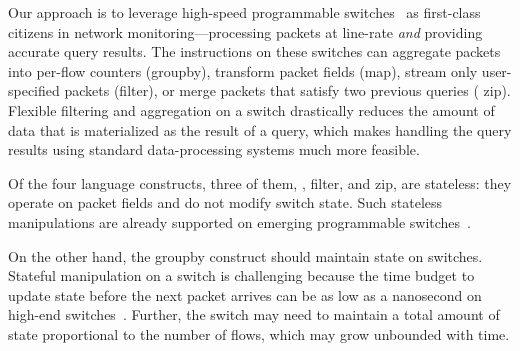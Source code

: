 Our approach is to leverage high-speed programmable switches~\cite{rmt, xpliant,
  tofino, flexpipe} as first-class citizens in network monitoring---processing
packets at line-rate {\em and} providing accurate query results.
The instructions on these switches can aggregate packets into per-flow counters
({\ct groupby}), transform packet fields ({\ct map}), stream only user-specified
packets ({\ct filter}), or merge packets that satisfy two previous queries ({\ct
  zip}). Flexible filtering and aggregation on a switch drastically reduces the
amount of data that is materialized as the result of a query, which makes
handling the query results using standard data-processing systems much more
feasible.

Of the four language constructs, three of them, , {\ct filter}, and
{\ct zip}, are stateless: they operate on packet fields and do not modify switch
state. Such stateless manipulations are already supported on emerging
programmable switches~\cite{rmt, xpliant, flexpipe, tofino}.

On the other hand, the {\ct groupby} construct should maintain state on switches.
Stateful manipulation on a switch is challenging because the time budget to
update state before the next packet arrives can be as low as a nanosecond on
high-end switches~\cite{domino_sigcomm}.  Further, the switch may need to
maintain a total amount of state proportional to the number of flows, which may
grow unbounded with time.

